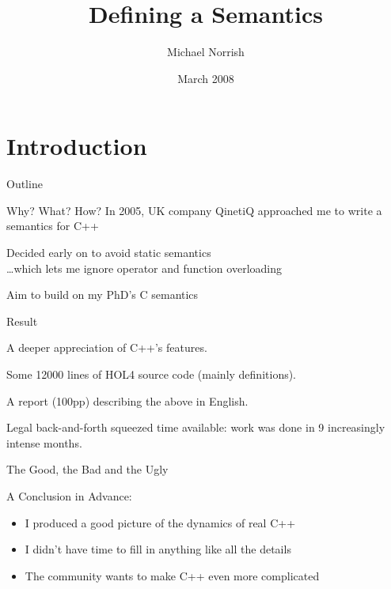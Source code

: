 \documentclass[compress,dvips,color=usenames,xcolor=dvipsnames]{beamer}
\title{Defining a \cpp{} Semantics}
\author{Michael Norrish}
\institute[NICTA]{Canberra Research Lab., NICTA}
\date{March 2008}
\newcommand{\cpp}{\mbox{C\hspace{-.1em}+\hspace{-.05em}+}}
\begin{document}
\frame{\titlepage}
\section{Introduction}
\begin{frame}{Outline}\tableofcontents\end{frame}

\begin{frame}{Why? What? How?}
In 2005, UK company QinetiQ approached me to write a semantics
  for \cpp{}

\bigskip
Decided early on to avoid static semantics\\[1mm]
  \quad\quad\dots {\footnotesize which lets me ignore operator and function overloading}

\bigskip
Aim to build on my PhD's C semantics
\end{frame}

\begin{frame}{Result}

A deeper appreciation of \cpp's features.

\bigskip
Some 12\hspace{.1em}000 lines of HOL4 source code (mainly definitions).

\bigskip
A report (100pp) describing the above in English.

\bigskip
Legal back-and-forth squeezed time available: work was done in 9
increasingly intense months.

\end{frame}

\begin{frame}{The Good, the Bad and the Ugly}

A Conclusion in Advance:
\begin{itemize}
\item I produced a good picture of the dynamics of real \cpp
\item I didn't have time to fill in anything like all the details
\item The community wants to make \cpp{} even more complicated
\end{itemize}

\end{frame}
\end{document}
